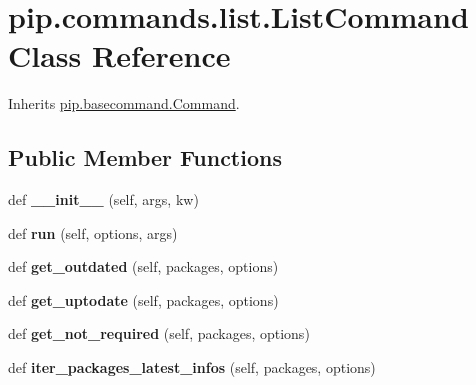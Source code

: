 \hypertarget{classpip_1_1commands_1_1list_1_1_list_command}{}\section{pip.\+commands.\+list.\+List\+Command Class Reference}
\label{classpip_1_1commands_1_1list_1_1_list_command}


Inherits \hyperlink{classpip_1_1basecommand_1_1_command}{pip.\+basecommand.\+Command}.

\subsection*{Public Member Functions}
\begin{DoxyCompactItemize}
\item 
\mbox{\label{classpip_1_1commands_1_1list_1_1_list_command_a1b285f9bfabbbfeb9da013bc2eb090de}} 
def {\bfseries \+\_\+\+\_\+init\+\_\+\+\_\+} (self, args, kw)
\item 
\mbox{\label{classpip_1_1commands_1_1list_1_1_list_command_aea39d9fad590f8eba11bea9c7aeda36c}} 
def {\bfseries run} (self, options, args)
\item 
\mbox{\label{classpip_1_1commands_1_1list_1_1_list_command_ab59d973fd0234a6e5286597b6bd9e2b2}} 
def {\bfseries get\+\_\+outdated} (self, packages, options)
\item 
\mbox{\label{classpip_1_1commands_1_1list_1_1_list_command_a445edaea60aa69c59dd7202a6d4fcbbe}} 
def {\bfseries get\+\_\+uptodate} (self, packages, options)
\item 
\mbox{\label{classpip_1_1commands_1_1list_1_1_list_command_a05dc81bd11b1336800fb04d0d6b6bebe}} 
def {\bfseries get\+\_\+not\+\_\+required} (self, packages, options)
\item 
\mbox{\label{classpip_1_1commands_1_1list_1_1_list_command_afb65e739ca2765600b7b9f10cfac1f0e}} 
def {\bfseries iter\+\_\+packages\+\_\+latest\+\_\+infos} (self, packages, options)

\end{DoxyCompactItemize}

